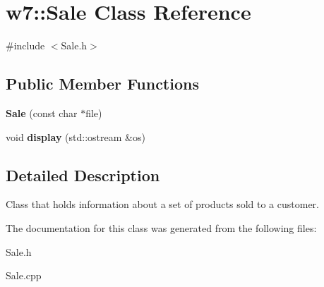 \hypertarget{classw7_1_1Sale}{}\section{w7\+:\+:Sale Class Reference}
\label{classw7_1_1Sale}


{\ttfamily \#include $<$Sale.\+h$>$}

\subsection*{Public Member Functions}
\begin{DoxyCompactItemize}
\item 
\mbox{\label{classw7_1_1Sale_a4eda8da6337cf8abc7c01143a1aa825f}} 
{\bfseries Sale} (const char $\ast$file)
\item 
\mbox{\label{classw7_1_1Sale_abf3135ceeee7067b64450c4d9156a4ec}} 
void {\bfseries display} (std\+::ostream \&os)
\end{DoxyCompactItemize}


\subsection{Detailed Description}
Class that holds information about a set of products sold to a customer. 

The documentation for this class was generated from the following files\+:\begin{DoxyCompactItemize}
\item 
Sale.\+h\item 
Sale.\+cpp\end{DoxyCompactItemize}
